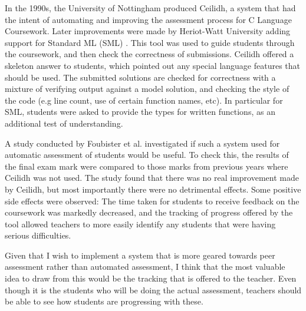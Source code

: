 \documentclass[a4paper,11pt]{report}
\begin{document}
In the 1990s, the University of Nottingham produced Ceilidh, a system that had the intent of automating and improving the assessment process for C Language Coursework. Later improvements were made by Heriot-Watt University adding support for
Standard ML (SML) \cite{foubister_automatic_1997}. This tool was used to guide students through the coursework, and then check the correctness of submissions. Ceilidh offered a skeleton answer to students, which pointed out any special language features that should be used. The submitted solutions are checked for correctness with a mixture of verifying output against a model solution, and checking the style of the code (e.g line count, use of certain function names, etc).  In particular for SML, students were asked to provide the types for written functions, as an additional test of understanding.\par
A study conducted by Foubister et al. investigated if such a system used for automatic assessment of students would be useful. To check this, the results of the final exam mark were compared to those marks from previous years where Ceilidh was not used. The study found that there was no real improvement made by Ceilidh, but most importantly there were no detrimental effects. Some positive side effects were observed: The time taken for students to receive feedback on the coursework was markedly decreased, and the tracking of progress offered by the tool allowed teachers to more easily identify any students that were having serious difficulties.\par
Given that I wish to implement a system that is more geared towards peer assessment rather than automated assessment, I think that the most valuable idea to draw from this would be the tracking that is offered to the teacher. Even though it is the students who will be doing the actual assessment, teachers should be able to see how students are progressing with these.\par
\end{document}
